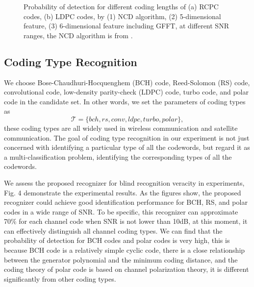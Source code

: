 \documentclass[conference]{IEEEtran}
\begin{document}
\begin{figure}[tbp]
{		
	}
	\caption{Probability of detection for different coding lengths of (a) RCPC codes, (b) LDPC codes, by (1) NCD algorithm, (2) 5-dimensional feature, (3) 6-dimensional feature including GFFT, at different SNR ranges, the NCD algorithm is from \cite{bonvard2018classification}.}
	\label{fig}
\end{figure}


\subsection{Coding Type Recognition}
We choose Bose-Chaudhuri-Hocquenghem (BCH) code, Reed-Solomon (RS) code, convolutional code, low-density parity-check (LDPC) code, turbo code, and polar code in the candidate set. In other words, we set the parameters of coding types as
\begin{equation}
	\mathcal{T} = \{bch, rs, conv, ldpc, turbo, polar\},
\end{equation}
these coding types are all widely used in wireless communication and satellite communication. The goal of coding type recognition in our experiment is not just concerned with identifying a particular type of all the codewords, but regard it as a multi-classification problem, identifying the corresponding types of all the codewords.

We assess the proposed recognizer for blind recognition veracity in experiments, Fig. 4 demonstrate the experimental results. As the figures show, the proposed recognizer could achieve good identification performance for BCH, RS, and polar codes in a wide range of SNR. To be specific, this recognizer can approximate 70\% for each channel code when SNR is not lower than 10dB, at this moment, it can effectively distinguish all channel coding types. We can find that the probability of detection for BCH codes and polar codes is very high, this is because BCH code is a relatively simple cyclic code, there is a close relationship between the generator polynomial and the minimum coding distance, and the coding theory of polar code is based on channel polarization theory, it is different significantly from other coding types.
\end{document}
